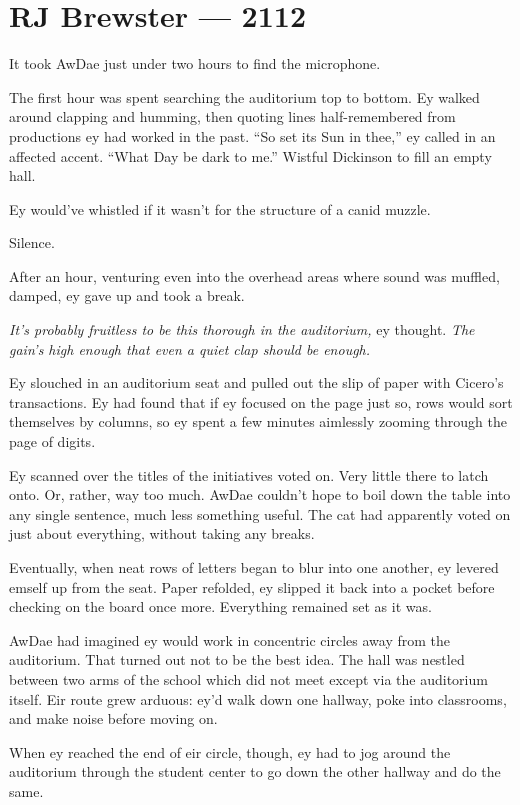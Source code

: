 \hypertarget{rj-brewster-2112}{%
\chapter*{RJ Brewster — 2112}\label{rj-brewster-2112}}

It took AwDae just under two hours to find the microphone.

The first hour was spent searching the auditorium top to bottom. Ey walked around clapping and humming, then quoting lines half-remembered from productions ey had worked in the past. ``So set its Sun in thee,'' ey called in an affected accent. ``What Day be dark to me.'' Wistful Dickinson to fill an empty hall.

Ey would've whistled if it wasn't for the structure of a canid muzzle.

Silence.

After an hour, venturing even into the overhead areas where sound was muffled, damped, ey gave up and took a break.

\emph{It's probably fruitless to be this thorough in the auditorium,} ey thought. \emph{The gain's high enough that even a quiet clap should be enough.}

Ey slouched in an auditorium seat and pulled out the slip of paper with Cicero's transactions. Ey had found that if ey focused on the page just so, rows would sort themselves by columns, so ey spent a few minutes aimlessly zooming through the page of digits.

Ey scanned over the titles of the initiatives voted on. Very little there to latch onto. Or, rather, way too much. AwDae couldn't hope to boil down the table into any single sentence, much less something useful. The cat had apparently voted on just about everything, without taking any breaks.

Eventually, when neat rows of letters began to blur into one another, ey levered emself up from the seat. Paper refolded, ey slipped it back into a pocket before checking on the board once more. Everything remained set as it was.

AwDae had imagined ey would work in concentric circles away from the auditorium. That turned out not to be the best idea. The hall was nestled between two arms of the school which did not meet except via the auditorium itself. Eir route grew arduous: ey'd walk down one hallway, poke into classrooms, and make noise before moving on.

When ey reached the end of eir circle, though, ey had to jog around the auditorium through the student center to go down the other hallway and do the same.

